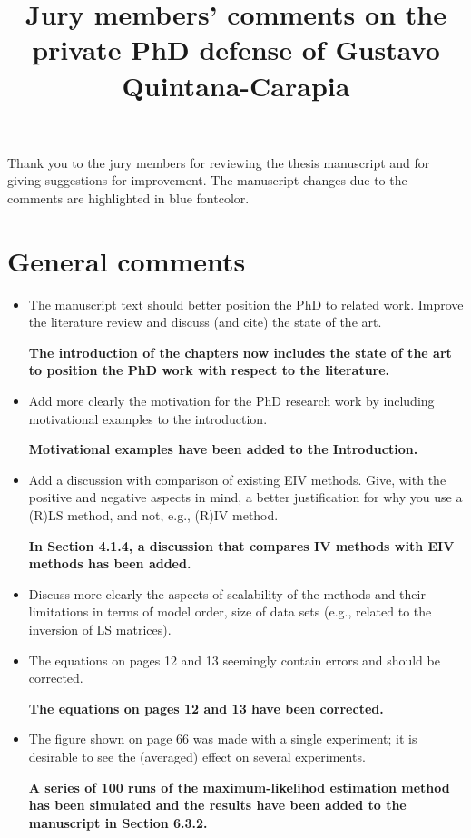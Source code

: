 \documentclass[11pt]{article}
\date{\vspace{-10ex}}
\begin{document}
\title{Jury members' comments on the private PhD defense of \linebreak Gustavo Quintana-Carapia} 

\maketitle

Thank you to the jury members for reviewing the thesis manuscript and for giving suggestions for improvement. 
The manuscript changes due to the comments are highlighted in \color{blue} blue fontcolor\color{black}.

\section*{General comments}

\begin{itemize}
	\item The manuscript text should better position the PhD to related work. Improve the literature review and discuss (and cite) the state of the art.
	
	{\bfseries The introduction of the chapters now includes the state of the art to position the PhD work with respect to the literature.}
	
	\item  Add more clearly the motivation for the PhD research work by including motivational examples to the introduction.
	
	{\bfseries Motivational examples have been added to the Introduction. }
	
	\item  Add a discussion with comparison of existing EIV methods. Give, with the positive and negative aspects in mind, a better justification for why you use a (R)LS method, and not, e.g., (R)IV method.
	
	{\bfseries In Section 4.1.4, a discussion that compares IV methods with EIV methods has been added.}

	\item  Discuss more clearly the aspects of scalability of the methods and their limitations in terms of model order, size of data sets (e.g., related to the inversion of LS matrices).
	\item  The equations on pages 12 and 13 seemingly contain errors and should be corrected.
	
	{\bfseries The equations on pages 12 and 13 have been corrected.}
	
	\item  The figure shown on page 66 was made with a single experiment; it is desirable to see the (averaged) effect on several experiments.
	
	{\bfseries A series of 100 runs of the maximum-likelihod estimation method has been simulated and the results have been added to the manuscript in Section 6.3.2.}
	
\end{itemize}
\end{document}
